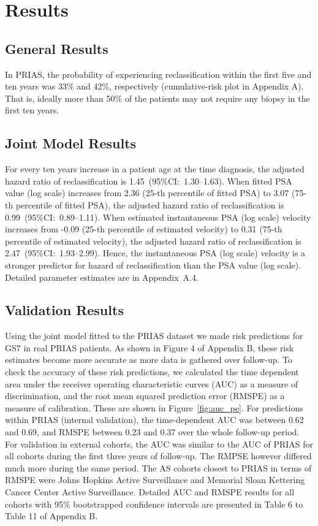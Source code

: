 \section{Results}
\subsection{General Results}
In PRIAS, the probability of experiencing reclassification within the first five and ten years was 33\% and 42\%, respectively (cumulative-risk plot in Appendix A). That is, ideally more than 50\% of the patients may not require any biopsy in the first ten years.

\subsection{Joint Model Results} 
For every ten years increase in a patient age at the time diagnosis, the adjusted hazard ratio of reclassification is 1.45~(95\%CI:~1.30--1.63). When fitted PSA value (log scale) increases from 2.36 (25-th percentile of fitted PSA) to 3.07 (75-th percentile of fitted PSA), the adjusted hazard ratio of reclassification is 0.99~(95\%CI:~0.89--1.11). When estimated instantaneous PSA (log scale) velocity increases from -0.09 (25-th percentile of estimated velocity) to 0.31 (75-th percentile of estimated velocity), the adjusted hazard ratio of reclassification is 2.47~(95\%CI:~1.93--2.99). Hence, the instantaneous PSA (log scale) velocity is a stronger predictor for hazard of reclassification than the PSA value (log scale). Detailed parameter estimates are in Appendix~A.4.

\subsection{Validation Results}
Using the joint model fitted to the PRIAS dataset we made risk predictions for GS7 in real PRIAS patients. As shown in Figure 4 of Appendix B, these risk estimates become more accurate as more data is gathered over follow-up. To check the accuracy of these risk predictions, we calculated the time dependent area under the receiver operating characteristic curves (AUC) as a measure of discrimination, and the root mean squared prediction error (RMSPE) as a measure of calibration. These are shown in Figure~\ref{fig:auc_pe}. For predictions within PRIAS (internal validation), the time-dependent AUC was between 0.62 and 0.69, and RMSPE between 0.23 and 0.37 over the whole follow-up period. For validation in external cohorts, the AUC was similar to the AUC of PRIAS for all cohorts during the first three years of follow-up. The RMPSE however differed much more during the same period. The AS cohorts closest to PRIAS in terms of RMSPE were Johns Hopkins Active Surveillance and Memorial Sloan Kettering Cancer Center Active Surveillance. Detailed AUC and RMSPE results for all cohorts with 95\% bootstrapped confidence intervals are presented in Table 6 to Table 11 of Appendix B.

